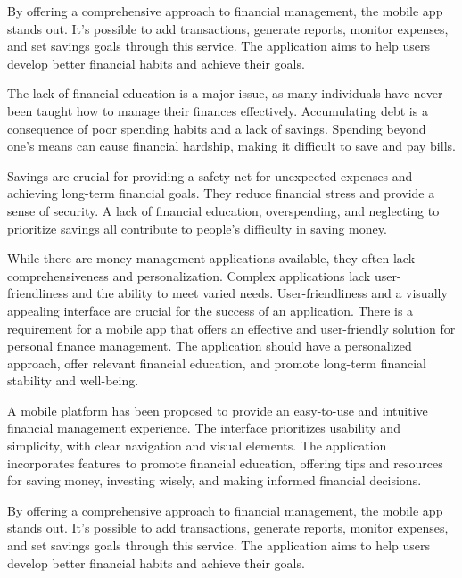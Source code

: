 \hspace{\parindent}By offering a comprehensive approach to financial management, the mobile app stands out. It's possible to add transactions, generate reports, monitor expenses, and set savings goals through this service. The application aims to help users develop better financial habits and achieve their goals.


\hspace{\parindent}The lack of financial education is a major issue, as many individuals have never been taught how to manage their finances effectively. Accumulating debt is a consequence of poor spending habits and a lack of savings. Spending beyond one’s means can cause financial hardship, making it difficult to save and pay bills.

\hspace{\parindent}Savings are crucial for providing a safety net for unexpected expenses and achieving long-term financial goals. They reduce financial stress and provide a sense of security. A lack of financial education, overspending, and neglecting to prioritize savings all contribute to people's difficulty in saving money.

\hspace{\parindent}While there are money management applications available, they often lack comprehensiveness and personalization. Complex applications lack user-friendliness and the ability to meet varied needs. User-friendliness and a visually appealing interface are crucial for the success of an application. There is a requirement for a mobile app that offers an effective and user-friendly solution for personal finance management. The application should have a personalized approach, offer relevant financial education, and promote long-term financial stability and well-being.

\hspace{\parindent}A mobile platform has been proposed to provide an easy-to-use and intuitive financial management experience. The interface prioritizes usability and simplicity, with clear navigation and visual elements. The application incorporates features to promote financial education, offering tips and resources for saving money, investing wisely, and making informed financial decisions.

\hspace{\parindent}By offering a comprehensive approach to financial management, the mobile app stands out. It's possible to add transactions, generate reports, monitor expenses, and set savings goals through this service. The application aims to help users develop better financial habits and achieve their goals.

